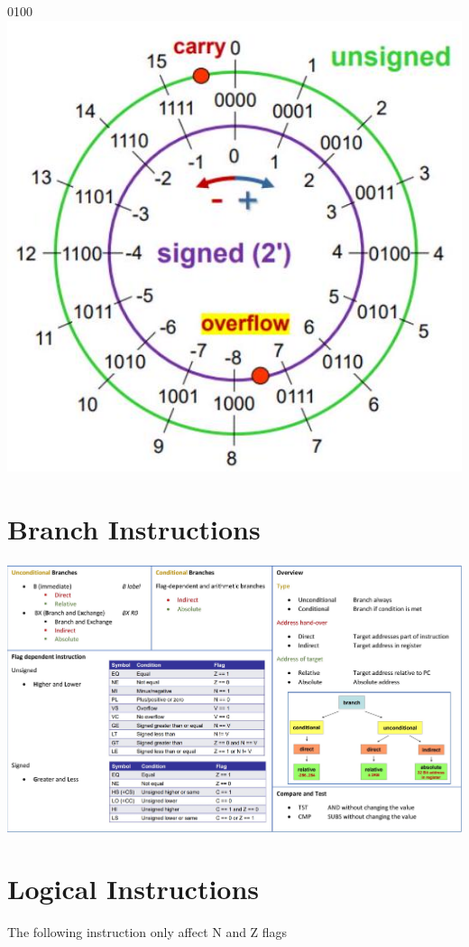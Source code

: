 \documentclass[10pt]{article}
\begin{document}
0100\\
\includegraphics[max width=\textwidth, center]{2024_12_29_79e6b22f503fb7b4f718g-04(2)}

\section*{Branch Instructions}
\begin{center}
\includegraphics[max width=\textwidth]{2024_12_29_79e6b22f503fb7b4f718g-05}
\end{center}

\section*{Logical Instructions}
The following instruction only affect N and Z flags
\end{document}
